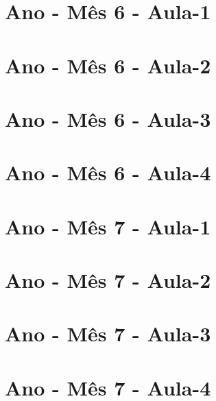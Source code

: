 \begin{multicols}{2}
\section[\sffamily 4\textordmasculine\space Ano - Mês 6 - Aula-1]{\textordmasculine\space Ano - Mês 6 - Aula-1}


\section[\sffamily 4\textordmasculine\space Ano - Mês 6 - Aula-2]{\textordmasculine\space Ano - Mês 6 - Aula-2}


\section[\sffamily 4\textordmasculine\space Ano - Mês 6 - Aula-3]{\textordmasculine\space Ano - Mês 6 - Aula-3}


\section[\sffamily 4\textordmasculine\space Ano - Mês 6 - Aula-4]{\textordmasculine\space Ano - Mês 6 - Aula-4}


\section[\sffamily 4\textordmasculine\space Ano - Mês 7 - Aula-1]{\textordmasculine\space Ano - Mês 7 - Aula-1}


\section[\sffamily 4\textordmasculine\space Ano - Mês 7 - Aula-2]{\textordmasculine\space Ano - Mês 7 - Aula-2}


\section[\sffamily 4\textordmasculine\space Ano - Mês 7 - Aula-3]{\textordmasculine\space Ano - Mês 7 - Aula-3}


\section[\sffamily 4\textordmasculine\space Ano - Mês 7 - Aula-4]{\textordmasculine\space Ano - Mês 7 - Aula-4}



\end{multicols}

